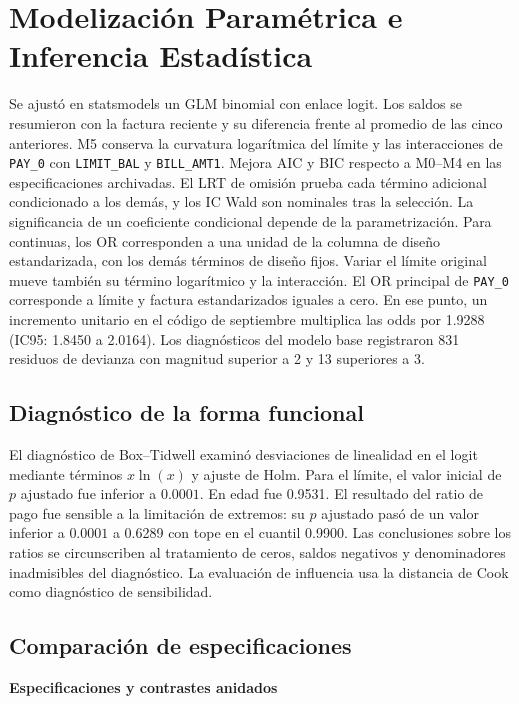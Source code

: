 \documentclass[11pt, a4paper]{article}
\begin{document}
\section{Modelización Paramétrica e Inferencia Estadística}
Se ajustó en statsmodels un GLM binomial con enlace logit. Los saldos se resumieron con la factura reciente y su diferencia frente al promedio de las cinco anteriores. M5 conserva la curvatura logarítmica del límite y las interacciones de \texttt{PAY\_0} con \texttt{LIMIT\_BAL} y \texttt{BILL\_AMT1}. Mejora AIC y BIC respecto a M0--M4 en las especificaciones archivadas. El LRT de omisión prueba cada término adicional condicionado a los demás, y los IC Wald son nominales tras la selección. La significancia de un coeficiente condicional depende de la parametrización. Para continuas, los OR corresponden a una unidad de la columna de diseño estandarizada, con los demás términos de diseño fijos. Variar el límite original mueve también su término logarítmico y la interacción. El OR principal de \texttt{PAY\_0} corresponde a límite y factura estandarizados iguales a cero. En ese punto, un incremento unitario en el código de septiembre multiplica las odds por 1.9288 (IC95: 1.8450 a 2.0164). Los diagnósticos del modelo base registraron 831 residuos de devianza con magnitud superior a 2 y 13 superiores a 3.

\subsection{Diagnóstico de la forma funcional}
El diagnóstico de Box--Tidwell examinó desviaciones de linealidad en el logit mediante términos $x \ln(x)$ y ajuste de Holm. Para el límite, el valor inicial de $p$ ajustado fue inferior a $0.0001$. En edad fue 0.9531. El resultado del ratio de pago fue sensible a la limitación de extremos: su $p$ ajustado pasó de un valor inferior a $0.0001$ a 0.6289 con tope en el cuantil 0.9900. Las conclusiones sobre los ratios se circunscriben al tratamiento de ceros, saldos negativos y denominadores inadmisibles del diagnóstico. La evaluación de influencia usa la distancia de Cook como diagnóstico de sensibilidad.

\subsection{Comparación de especificaciones}
\par\medskip\noindent\textbf{Especificaciones y contrastes anidados}
\end{document}
